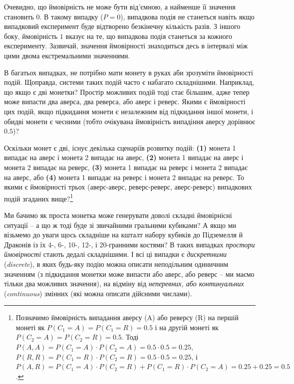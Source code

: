 \documentclass[
  11pt,
]{book}
\begin{document}
Очевидно, що ймовірність не може бути від'ємною, а найменше її значення становить \(0\). В такому випадку (\(P = 0\)), випадкова подія не станеться навіть якщо випадковий експеримент буде відтворено безкінечну кількість разів. З іншого боку, ймовірність \(1\) вказує на те, що випадкова подія станеться за кожного експерименту. Зазвичай, значення ймовірності знаходиться десь в інтервалі між цими двома екстремальними значеннями.

В багатьох випадках, не потрібно мати монету в руках аби зрозуміти ймовірності подій. Щоправда, системи таких подій часто є набагато складнішими. Наприклад, що якщо є дві монетки? Простір можливих подій тоді стає більшим, адже тепер може випасти два аверса, два реверса, або аверс і реверс. Якими є ймовірності цих подій, якщо підкидання монети є незалежним від підкидання іншої монети, і обидві монети є чесними (тобто очікувана ймовірність випадіння аверсу дорівнює \(0.5\))?

Оскільки монет є дві, існує декілька сценаріїв розвитку подій: \textbf{(1)} монета 1 випадає на аверс і монета 2 випадає на аверс, \textbf{(2)} монета 1 випадає на аверс і монета 2 випадає на реверс, \textbf{(3)} монета 1 випадає на реверс і монета 2 випадає на аверс, або \textbf{(4)} монета 1 випадає на реверс і монета 2 випадає на реверс. То якими є ймовірності трьох (аверс-аверс, реверс-реверс, аверс-реверс) випадкових подій згаданих вище?\footnote{Позначимо ймовірність випадання аверсу (A) або реверсу (R) на першій монеті як \(P(C_1 = A) = P(C_1 = R) = 0.5\) і на другій монеті як \(P(C_2 = A) = P(C_2 = R) = 0.5\). Тоді \(P(A, A) = P(C_1 = A) \cdot P(C_2 =  A) = 0.5 \cdot 0.5 = 0.25\), \(P(R, R) = P(C_1 = R) \cdot P(C_2 =  R) = 0.5 \cdot 0.5 = 0.25\), і \(P(A, R) = P(C_1 = A) \cdot P(C_2 = R) + P(C_1 = R) \cdot P(C_2 = A) = 0.25 + 0.25 = 0.5\).}

Ми бачимо як проста монетка може генерувати доволі складні ймовірнісні ситуації -- а що ж тоді буде зі звичайними гральними кубиками? А якщо ми візьмемо до уваги щось складніше на кшталт набору кубиків до Підземелля й Драконів із їх 4-, 6-, 10-, 12-, і 20-гранними костями? В таких випадках \emph{простори ймовірності} стають дедалі складнішими. І всі ці випадки є \emph{дискретними} (\emph{discrete}), в яких будь-яку подію можна описати неподільним одиничним значенням (з підкидання монетки може випасти або аверс, або реверс -- ми маємо тільки два можливих значення), на відміну від \emph{неперевних, або континуальних} (\emph{continuous}) змінних (які можна описати дійсними числами).
\end{document}
